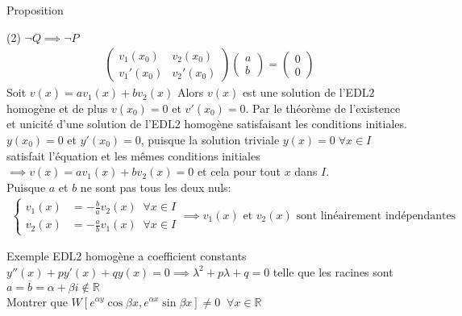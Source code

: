 \begin{parag}{Proposition}
\begin{subparag}{(2) $\neg Q \implies \neg P$}
\begin{align*}
        \begin{pmatrix}
            v_1(x_0) & v_2(x_0) \\
            v_1'(x_0) & v_2'(x_0)
        \end{pmatrix} \begin{pmatrix}
            a\\ b
        \end{pmatrix} = \begin{pmatrix}
            0\\ 0
        \end{pmatrix}
    \end{align*}
    Soit $v(x) = av_1(x) + bv_2(x)$ Alors $v(x)$ est une solution de l'EDL2 homogène et de plus $v(x_0) = 0$ et $v'(x_0) = 0$. Par le théorème de l'existence et unicité d'une solution de l'EDL2 homogène satisfaisant les conditions initiales. $y(x_0) = 0$ et $y'(x_0) = 0$, puisque la solution triviale $y(x) = 0 \; \forall x \in I$ satisfait l'équation et les mêmes conditions initiales $ \implies v(x) = av_1(x) + bv_2(x) = 0$ et cela pour tout $x$ dans $I$.
    \\
    Puisque $a$ et $b$ ne sont pas tous les deux nuls:
    \begin{align*}
        \begin{cases}
            v_1(x) &= - \frac{b}{a}v_2(x) \; \; \forall x \in I \\
            v_2(x) &= - \frac{a}{b} v_1(x) \; \; \forall x \in I
        \end{cases}
        \implies v_1(x) \text{ et } v_2(x) \text{ sont linéairement indépendantes}
    \end{align*}
\end{subparag}

\begin{subparag}{Exemple}
    EDL2 homogène a coefficient constants $y''(x) + py'(x) + qy(x) = 0 \implies \lambda^2 + p \lambda + q = 0$ telle que les racines sont $a = \overline{b} =  \alpha + \beta i \notin \mathbb{R}$ \\
    Montrer que $W[e^{ \alpha y} \cos \beta x, e^{ \alpha x} \sin \beta x] \neq 0 \; \; \forall x \in \mathbb{R}$
    
\end{subparag}
\end{parag}

